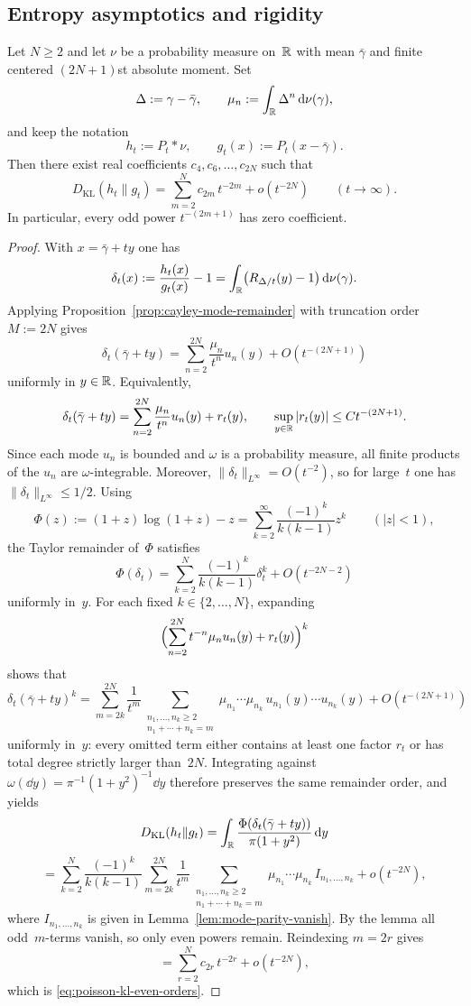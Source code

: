 \subsection{Entropy asymptotics and rigidity}

\begin{theorem}%
\label{thm:poisson-kl-even-orders}
Let $N\ge 2$ and let $\nu$ be a probability measure on~$\mathbb{R}$ with mean
$\bar\gamma$ and finite centered $(2N+1)$st absolute moment.  Set
\[
\Delta:=\gamma-\bar\gamma,
\qquad
\mu_n:=\int_{\mathbb{R}}\Delta^n\,\mathrm{d}\nu(\gamma),
\]
and keep the notation
\[
h_t:=P_t*\nu,
\qquad
g_t(x):=P_t(x-\bar\gamma).
\]
Then there exist real coefficients $c_4,c_6,\dots,c_{2N}$ such that
\begin{equation}\label{eq:poisson-kl-even-orders}
D_{\mathrm{KL}}(h_t\|g_t)
=\sum_{m=2}^{N}c_{2m}\,t^{-2m}+o(t^{-2N})
\qquad(t\to\infty).
\end{equation}
In particular, every odd power $t^{-(2m+1)}$ has zero coefficient.
\end{theorem}

\begin{proof}
With $x=\bar\gamma+ty$ one has
\[
\delta_t(x):=\frac{h_t(x)}{g_t(x)}-1
=\int_{\mathbb{R}}\bigl(R_{\Delta/t}(y)-1\bigr)\,\mathrm{d}\nu(\gamma).
\]
Applying Proposition~\ref{prop:cayley-mode-remainder} with truncation
order $M:=2N$ gives
\[
\delta_t(\bar\gamma+ty)
=\sum_{n=2}^{2N}\frac{\mu_n}{t^n}u_n(y)+O(t^{-(2N+1)})
\]
uniformly in $y\in\mathbb{R}$.  Equivalently,
\[
\delta_t(\bar\gamma+ty)
=\sum_{n=2}^{2N}\frac{\mu_n}{t^n}u_n(y)+r_t(y),
\qquad
\sup_{y\in\mathbb{R}}|r_t(y)|\le Ct^{-(2N+1)}.
\]
Since each mode $u_n$ is bounded and $\omega$ is a probability measure,
all finite products of the $u_n$ are $\omega$-integrable.  Moreover,
$\|\delta_t\|_{L^\infty}=O(t^{-2})$, so for large~$t$ one has
$\|\delta_t\|_{L^\infty}\le 1/2$.  Using
\[
\Phi(z):=(1+z)\log(1+z)-z
=\sum_{k=2}^{\infty}\frac{(-1)^k}{k(k-1)}z^k
\qquad(|z|<1),
\]
the Taylor remainder of~$\Phi$ satisfies
\[
\Phi(\delta_t)
=\sum_{k=2}^{N}\frac{(-1)^k}{k(k-1)}\delta_t^k+O(t^{-2N-2})
\]
uniformly in~$y$.  For each fixed $k\in\{2,\dots,N\}$, expanding
\[
\Bigl(\sum_{n=2}^{2N}t^{-n}\mu_nu_n(y)+r_t(y)\Bigr)^k
\]
shows that
\[
\delta_t(\bar\gamma+ty)^k
=\sum_{m=2k}^{2N}\frac{1}{t^m}
\sum_{\substack{n_1,\dots,n_k\ge 2\\n_1+\cdots+n_k=m}}
\mu_{n_1}\cdots\mu_{n_k}\,u_{n_1}(y)\cdots u_{n_k}(y)
+O(t^{-(2N+1)})
\]
uniformly in~$y$: every omitted term either contains at least one factor
$r_t$ or has total degree strictly larger than~$2N$.  Integrating against
$\omega(\dd y)=\pi^{-1}(1+y^2)^{-1}\dd y$ therefore preserves the same
remainder order, and yields
\[
D_{\mathrm{KL}}(h_t\|g_t)
=\int_{\mathbb{R}}\frac{\Phi(\delta_t(\bar\gamma+ty))}{\pi(1+y^2)}\,\mathrm{d} y
\]
\[
=\sum_{k=2}^{N}\frac{(-1)^k}{k(k-1)}
\sum_{m=2k}^{2N}\frac{1}{t^m}
\sum_{\substack{n_1,\dots,n_k\ge 2\\n_1+\cdots+n_k=m}}
\mu_{n_1}\cdots\mu_{n_k}\,I_{n_1,\dots,n_k}
+o(t^{-2N}),
\]
where $I_{n_1,\dots,n_k}$ is given in
Lemma~\ref{lem:mode-parity-vanish}.  By the lemma all odd~$m$-terms
vanish, so only even powers remain.  Reindexing $m=2r$ gives
\[
=\sum_{r=2}^{N} c_{2r}\,t^{-2r}+o(t^{-2N}),
\]
which is \eqref{eq:poisson-kl-even-orders}.
\end{proof}

